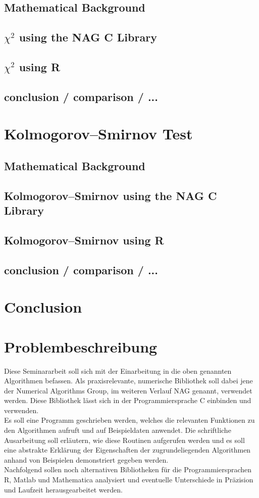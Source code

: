 \documentclass{article}
\begin{document}
\subsection{Mathematical Background}
\subsection{$\chi^2$ using the NAG C Library}
\subsection{$\chi^2$ using R}
\subsection{conclusion / comparison / ...}

\section{Kolmogorov–Smirnov Test}
\subsection{Mathematical Background}
\subsection{Kolmogorov–Smirnov using the NAG C Library}
\subsection{Kolmogorov–Smirnov using R}
\subsection{conclusion / comparison / ...}

\section{Conclusion}

\section{Problembeschreibung}
Diese Seminararbeit soll sich mit der Einarbeitung in die oben genannten Algorithmen befassen.
Als praxisrelevante, numerische Bibliothek soll dabei jene der Numerical Algorithms Group, im weiteren Verlauf NAG genannt, verwendet werden. Diese Bibliothek lässt sich in der Programmiersprache C einbinden und verwenden.\\
Es soll eine Programm geschrieben werden, welches die relevanten Funktionen zu den Algorithmen aufruft und auf Beispieldaten anwendet. Die schriftliche Ausarbeitung soll erläutern, wie diese Routinen aufgerufen werden und es soll eine abstrakte Erklärung der Eigenschaften der zugrundeliegenden Algorithmen anhand von Beispielen demonstriert gegeben werden.\\
Nachfolgend sollen noch alternativen Bibliotheken für die Programmiersprachen R, Matlab und Mathematica analysiert und eventuelle Unterschiede in Präzision und Laufzeit herausgearbeitet werden.
\end{document}
